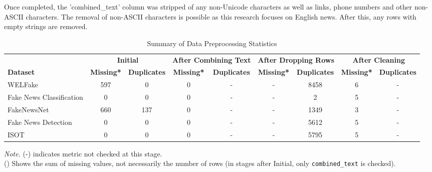 \documentclass[stu,12pt,floatsintext,donotrepeattitle]{apa7}
\begin{document}
Once completed, the 'combined\_text' column was stripped of any non-Unicode characters as well as links, phone numbers and other non-ASCII characters. The removal of non-ASCII characters is possible as this research focuses on English news. After this, any rows with empty strings are removed. 

\begin{table}[H]
    \centering
    \scriptsize %
    \setlength{\tabcolsep}{3pt} %
    \caption{Summary of Data Preprocessing Statistics}
    \label{tab:preprocessing_stats}
    \begin{tabular}{l cc cc cc cc}
        \toprule
         & \multicolumn{2}{c}{\textbf{Initial}} 
         & \multicolumn{2}{c}{\textbf{After Combining Text}} 
         & \multicolumn{2}{c}{\textbf{After Dropping Rows}} 
         & \multicolumn{2}{c}{\textbf{After Cleaning}} \\
        \cmidrule(lr){2-3} \cmidrule(lr){4-5} \cmidrule(lr){6-7} \cmidrule(lr){8-9}
        \textbf{Dataset} & \textbf{Missing*} & \textbf{Duplicates} & \textbf{Missing*} & \textbf{Duplicates} & \textbf{Missing*} & \textbf{Duplicates} & \textbf{Missing*} & \textbf{Duplicates} \\
        \midrule
        WELFake & 597 & 0 & 0 & - & - & 8458 & 6 & - \\
        Fake News Classification & 0 & 0 & 0 & - & - & 2 & 5 & - \\
        FakeNewsNet & 660 & 137 & 0 & - & - & 1349 & 3 & - \\
        Fake News Detection & 0 & 0 & 0 & - & - & 5612 & 5 & - \\
        ISOT & 0 & 0 & 0 & - & - & 5795 & 5 & - \\
        \bottomrule
    \end{tabular}
    \par\medskip
    \raggedright
    \footnotesize{\textit{Note.} (-) indicates metric not checked at this stage. \\
    (\*) Shows the sum of missing values, not necessarily the number of rows (in stages after Initial, only \texttt{combined\_text} is checked).}
\end{table}
\end{document}
